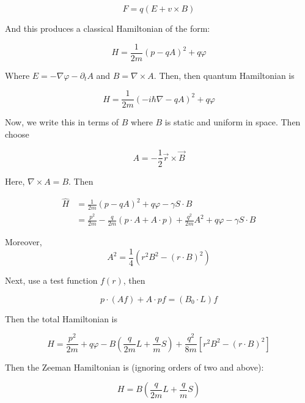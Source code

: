 \documentclass{article}
\newtheorem{one minute paper}[theorem]{One Minute Paper}
\begin{document}
\begin{equation}
    F = q\left( E + v \times B \right)
\end{equation}

And this produces a classical Hamiltonian of the form: 

\begin{equation}
    H = \frac{1}{2m}\left( p - q A \right)^2 + q\varphi
\end{equation}

Where $E = -\nabla \varphi - \partial_t A$ and $B = \nabla \times A$. Then, then quantum Hamiltonian is 

\begin{equation}
    H = \frac{1}{2m}\left( -i\hbar \nabla  - qA \right)^2 + q\varphi
\end{equation}

Now, we write this in terms of $B$ where $B$ is static and uniform in space. Then choose 

\begin{equation}
    A = -\frac{1}{2}\vec{r} \times \vec{B}
\end{equation}

Here, $\nabla \times A = B$. Then 

\begin{align*}
    \hat{H} &= \frac{1}{2m}\left( p - qA \right)^2 + q\varphi - \gamma S \cdot B \\
    &= \frac{p^2}{2m} - \frac{q}{2m}\left( p \cdot A + A \cdot p \right) + \frac{q^2}{2m}A^2 + q\varphi - \gamma S \cdot B
\end{align*}

Moreover, $$A^2 = \frac{1}{4}\left( r^2 B^2 - \left( r \cdot B \right)^2 \right)$$

Next, use a test function $f(r)$, then 

\begin{equation}
    p\cdot (Af) + A \cdot pf = (B_0 \cdot L) f
\end{equation}

Then the total Hamiltonian is 

\begin{equation}
    H = \frac{p^2}{2m} + q\varphi - B\left( \frac{q}{2m} L + \frac{q}{m}S \right) + \frac{q^2}{8m}[r^2 B^2 - (r \cdot B)^2]
\end{equation}

Then the Zeeman Hamiltonian is (ignoring orders of two and above):

\begin{equation}
    H = B\left( \frac{q}{2m} L + \frac{q}{m}S \right)
\end{equation}
\end{document}
